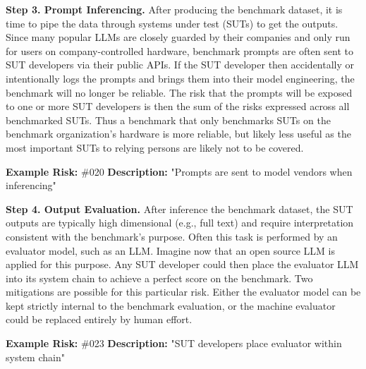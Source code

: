\documentclass{article}
\begin{document}
{\bf Step 3. Prompt Inferencing.} After producing the benchmark dataset, it is time to pipe the data through systems under test (SUTs) to get the outputs. Since many popular LLMs are closely guarded by their companies and only run for users on company-controlled hardware, benchmark prompts are often sent to SUT developers via their public APIs. If the SUT developer then accidentally or intentionally logs the prompts and brings them into their model engineering, the benchmark will no longer be reliable. The risk that the prompts will be exposed to one or more SUT developers is then the sum of the risks expressed across all benchmarked SUTs. Thus a benchmark that only benchmarks SUTs on the benchmark organization's hardware is more reliable, but likely less useful as the most important SUTs to relying persons are likely not to be covered.

\begin{center}
    \begin{tcolorbox}[colback=gray!10, colframe=black!50, width=\textwidth, boxrule=0.5mm, sharp corners, coltext=black]
        {\bf Example Risk:} \#020
        \newline
        {\bf Description:} "Prompts are sent to model vendors when inferencing"
    \end{tcolorbox}
\end{center}

{\bf Step 4. Output Evaluation.} After inference the benchmark dataset, the SUT outputs are typically high dimensional (e.g., full text) and require interpretation consistent with the benchmark's purpose. Often this task is performed by an evaluator model, such as an LLM. Imagine now that an open source LLM is applied for this purpose. Any SUT developer could then place the evaluator LLM into its system chain to achieve a perfect score on the benchmark. Two mitigations are possible for this particular risk. Either the evaluator model can be kept strictly internal to the benchmark evaluation, or the machine evaluator could be replaced entirely by human effort.

\begin{center}
    \begin{tcolorbox}[colback=gray!10, colframe=black!50, width=\textwidth, boxrule=0.5mm, sharp corners, coltext=black]
        {\bf Example Risk:} \#023
        \newline
        {\bf Description:} "SUT developers place evaluator within system chain"
    \end{tcolorbox}
\end{center}
\end{document}
